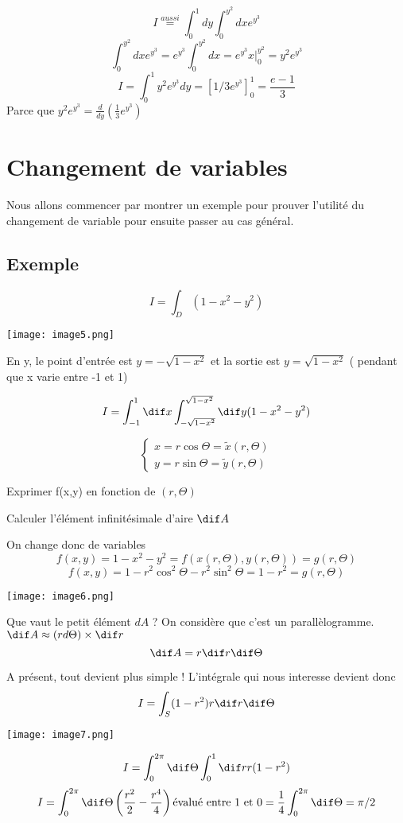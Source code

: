 \[I \overset{aussi}{=}\int_0^1dy \int_0^{y^2} dx e^{y^3}\]
\[\int_0^{y^2} dx e^{y^3} = e^{y^3} \int_0^{y^2} dx = e^{y^3} x \Big|_0^{y^2} = y^2 e^{y^3}\]
\[I=\int_0^1 y^2 e^{y^3} dy = \left[1/3 e ^{y^3}\right]_0^1  = \frac{e-1}{3}\]
Parce que
$y^2 e^{y^3} = \frac{d}{dy}(\frac{1}{3} e^{y^3})$

\section{Changement de variables}
Nous allons commencer par montrer un exemple pour prouver l'utilité du changement de variable pour ensuite passer au cas général.
\subsection{Exemple}
\[I=\int_D (1-x^2-y^2)\]
\begin{center}
\texttt{[image: image5.png]}
\end{center}

 En y, le point d'entrée est $y=-\sqrt{1-x^2}$ et la sortie est  $y=\sqrt{1-x^2}$ ( pendant que x varie entre -1 et 1)

 \[I=\int_{-1}^1 \dif x \int_{-\sqrt{1-x^2}}^{\sqrt{1-x^2}} \dif y(1-x^2-y^2) \]

 \begin{myrem}
 $$\left\{
 \begin{array}{r}
 x=r\cos\Theta = \tilde{x}(r,\Theta)\\
 y=r \sin \Theta = \tilde{y}(r,\Theta)
 \end{array}
 \right.
 $$

 Exprimer f(x,y) en fonction de $(r,\Theta)$
 
 Calculer l'élément infinitésimale d'aire $\dif A$
 \end{myrem}

 On change donc de variables
 \[f(x,y)=1-x^2-y^2=f(x(r,\Theta),y(r,\Theta)) = g(r,\Theta)\]
 \[f(x,y) = 1-r^2\cos^2\Theta -r^2\sin^2\Theta = 1-r^2 = g(r,\Theta)\]
 \begin{center}

 \texttt{[image: image6.png]}\\

 \end{center}
 Que vaut le petit élément $dA$ ? On considère que c'est un parallèlogramme.
 $\dif A\approx (rd\Theta)\times \dif r$
 \[\dif A = r \dif r \dif\Theta\]

 A présent, tout devient plus simple ! L'intégrale qui nous interesse devient donc
 \[I=\int_S (1-r^2)r \dif r \dif\Theta\]
\begin{center}
 \texttt{[image: image7.png]}
\end{center}
 \[I=\int_0^{2\pi} \dif\Theta \int_0^1 \dif r r (1-r^2)\]
 \[I = \int_0^{2\pi} \dif \Theta \left(\frac{r^2}{2}-\frac{r^4}{4} \right) \text{évalué entre 1 et 0} = \frac{1}{4} \int_0^{2\pi} \dif \Theta = \pi/2 \]

